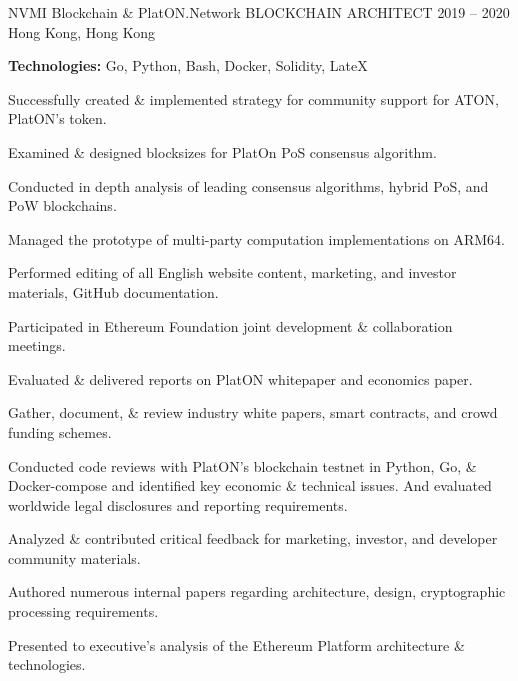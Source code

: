 \begin{cventries}
  \cventry
    {NVMI Blockchain \& PlatON.Network} %
    {BLOCKCHAIN ARCHITECT} %
    {2019 – 2020} %
    {Hong Kong, Hong Kong} %
    {
      \begin{cvitems} %
        \item \textbf{Technologies:} Go, Python, Bash, Docker, Solidity, LateX
        \item Successfully created \& implemented strategy for community support for ATON, PlatON’s token.
        \item Examined \& designed blocksizes for PlatOn PoS consensus algorithm.
        \item Conducted in depth analysis of leading consensus algorithms, hybrid PoS, and PoW blockchains.
        \item Managed the prototype of multi-party computation implementations on ARM64.
        \item Performed editing of all English website content, marketing, and investor materials, GitHub documentation.
        \item Participated in Ethereum Foundation joint development \& collaboration meetings.
        \item Evaluated \& delivered reports on PlatON whitepaper and economics paper.
        \item Gather, document, \& review industry white papers, smart contracts, and crowd funding schemes.
        \item Conducted code reviews with PlatON’s blockchain testnet in Python, Go, \& Docker-compose and identified key economic \& technical issues. And evaluated worldwide legal disclosures and reporting requirements.
        \item Analyzed \& contributed critical feedback for marketing, investor, and developer community materials.
        \item Authored numerous internal papers regarding architecture, design, cryptographic processing requirements.
        \item Presented to executive’s analysis of the Ethereum Platform architecture \& technologies.
      \end{cvitems}
    }


\end{cventries}
